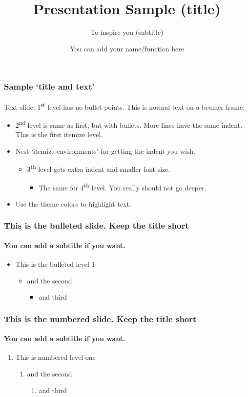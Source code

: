 \documentclass[
	t, %
	aspectratio=43, %
	12pt %
]{beamer}
\title{Presentation Sample (title)}
\subtitle{To inspire you (subtitle)} %
\author{You can add your name/function here}
\begin{document}

\begin{frame}
	\frametitle{Sample `title and text'}
	Text slide: 1\textsuperscript{st} level has no bullet points. This is normal text on a beamer frame.
	\begin{itemize}
		\item 2\textsuperscript{nd} level is same as first, but with bullets. More lines have the same indent. This is the first itemize level.
		\item Nest \alert{`itemize environments'} for getting the indent you wish.
		\begin{itemize}
			\item 3\textsuperscript{th} level gets extra indent and smaller font size.			
			\begin{itemize}
				\item The same for 4\textsuperscript{th} level. You really should not go deeper. %
			\end{itemize}
		\end{itemize}
		\item Use the \alert{theme colors} to highlight text.
	\end{itemize}	
\end{frame}

\begin{frame}
	\frametitle{This is the bulleted slide. Keep the title short}
	\framesubtitle{You can add a subtitle if you want.} %
	\begin{itemize}
		\item This is the bulleted level 1 
		\begin{itemize}
			\item and the second
			\begin{itemize}
				\item and third %
			\end{itemize}
		\end{itemize}
	\end{itemize}	
\end{frame}

\begin{frame}
	\frametitle{This is the numbered slide. Keep the title short}
	\framesubtitle{You can add a subtitle if you want.} %
	\begin{enumerate}
		\item This is numbered level one
		\begin{enumerate}
			\item and the second
			\begin{enumerate}
				\item and third %
			\end{enumerate}
		\end{enumerate}
	\end{enumerate}	
\end{frame}
\end{document}
